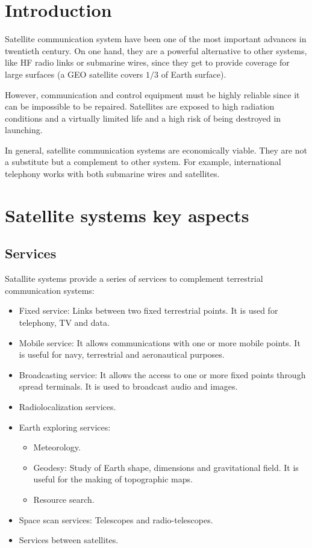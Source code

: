 \documentclass[../main.tex]{subfiles}
\begin{document}
\section{Introduction}

Satellite communication system have been one of the most important advances in twentieth century. On one hand, they are a powerful alternative to other systems, like HF radio links or submarine wires, since they get to provide coverage for large surfaces (a GEO satellite covers $1/3$ of Earth surface).

However, communication and control equipment must be highly reliable since it can be impossible to be repaired. Satellites are exposed to high radiation conditions and a virtually limited life and a high risk of being destroyed in launching.

In general, satellite communication systems are economically viable. They are not a substitute but a complement to other system. For example, international telephony works with both submarine wires and satellites.

\section{Satellite systems key aspects}

\subsection{Services}

Satallite systems provide a series of services to complement terrestrial communication systems:
\begin{itemize}
	\item Fixed service: Links between two fixed terrestrial points. It is used for telephony, TV and data.
	\item Mobile service: It allows communications with one or more mobile points. It is useful for navy, terrestrial and aeronautical purposes.
	\item Broadcasting service: It allows the access to one or more fixed points through spread terminals. It is used to broadcast audio and images.
	\item Radiolocalization services.
	\item {
		Earth exploring services:
		\begin{itemize}
			\item Meteorology.
			\item Geodesy: Study of Earth shape, dimensions and gravitational field. It is useful for the making of topographic maps.
			\item Resource search.
		\end{itemize}
	}
	\item Space scan services: Telescopes and radio-telescopes.
	\item Services between satellites.
\end{itemize}
\end{document}
